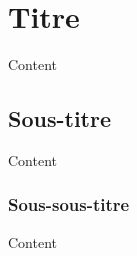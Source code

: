 \section{Titre}

Content


\subsection{Sous-titre}

Content


\subsubsection{Sous-sous-titre}

Content

